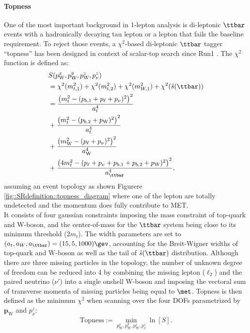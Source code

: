 \paragraph{Topness}
One of the most important background in 1-lepton analysis is di-leptonic $\ttbar$ events with a hadronically decaying tau lepton or a lepton that fails the baseline requirement. To reject those events, a $\chi^2$-based di-leptonic $\ttbar$ tagger ``topness'' has been designed in context of scalar-top search since Run1 \cite{Topness}. 
The $\chi^2$ function is defined as:
\begin{align}
& S(p_{\mathrm{W}}^x, p_{\mathrm{W}}^y, p_{\mathrm{W}}^z, p_{\nu}^z)  \nn  \\
& = \chi^2(m_{t,1}^2) + \chi^2(m_{t,2}^2) + \chi^2(m_{W,1}^2) + \chi^2(\hat{s}(\ttbar))  \nn  \\
& = \frac{  \left( m_t^2 - (p_{b,1}+p_{\ell}+p_{\nu})^2                      \right)^2   }{a_t^4}  \nn \\
& + \frac{  \left( m_t^2 - (p_{b,2}+p_\mathrm{W})^2                          \right)^2   }{a_t^4}  \nn  \\
& + \frac{  \left( m_\mathrm{W}^2 - (p_{\ell}+p_{\nu})^2                     \right)^2   }{a_\mathrm{W}^4}  \nn \\
& + \frac{  \left( 4m_t^2- (p_{\ell}+p_{\nu}+p_{b,1}+p_{b,2}+p_\mathrm{W})^2 \right)^2   }{a_{\ttbar}^4},
\label{eq:SRdefinition::topness}
\end{align}
assuming an event topology as shown Figurere \ref{fig::SRdefinition::topness_diagram} where one of the lepton are totally undetected and the momentum does fully contribute to MET. \\
It consists of four gaussian constraints imposing the mass constraint of top-quark and W-boson, and the center-of-mass for the $\ttbar$ system being close to its minimum threshold ($2m_t$). The width parameters are set to $(a_t, a_W, a_{\ttbar})=(15,5,1000) \gev$, accounting for the Breit-Wigner widths of top-quark and W-boson as well as the tail of $\hat{s}(\ttbar)$ distribution. Although there are three missing particles in the topology, the number of unknown degree of freedom can be reduced into 4 by combining the missing lepton ($\ell_2$) and the paired neutrino ($\nu'$) into a single onshell W-boson and imposing the vectoral sum of transverse momenta of missing particles being equal to $\met$. 
Topness is then defined as the minimum $\chi^2$ when scanning over the four DOFs parametrized by $\bm{p}_{\mathrm{W}}$ and $p_{\nu}^z$:
\begin{align}
\mathrm{Topness} := \min_{p_{\mathrm{W}}^x, p_{\mathrm{W}}^y, p_{\mathrm{W}}^z, p_{\nu}^z} \ln[S].
\end{align}
